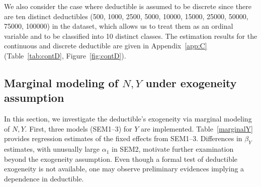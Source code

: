 \documentclass[11pt]{article}
\newcommand{\rev}[1]{{\color{blue}#1}}
\begin{document}
{We also consider the case where deductible is assumed to be discrete since there are ten distinct deductibles (500, 1000, 2500, 5000, 10000, 15000, 25000, 50000, 75000, 100000) in the dataset, which allows us to treat them as an ordinal variable and to be classified into 10 distinct classes. The estimation results for the continuous and discrete deductible are given in Appendix~\ref{app:C} (Table~\ref{tab:contD}, Figure~\ref{fig:contD}).

\subsection{Marginal modeling of $N, Y$ under exogeneity assumption}
\label{section:marginalNY}

In this section, we investigate the deductible's exogeneity via marginal modeling of $N, Y$. First, three models (SEM1--3) for $Y$ are implemented. Table~\ref{marginalY} provides regression estimates of the fixed effects from SEM1--3. \rev{Differences in $\beta_Y$ estimates, with unusually large $\alpha_1$ in SEM2, motivate further examination beyond the exogeneity assumption. Even though a formal test of deductible exogeneity is not available, one may observe preliminary evidences implying a dependence in deductible.}


}
\end{document}
